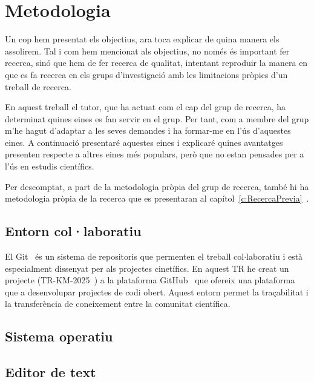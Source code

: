 \chapter{Metodologia}


Un cop hem presentat els objectius, ara toca explicar de quina manera els assolirem. Tal i com hem mencionat als objectius, no només és important fer recerca, sinó que hem de fer recerca de qualitat, intentant reproduir la manera en que es fa recerca en els grups d'investigació amb les limitacions pròpies d'un treball de recerca.

En aquest treball el tutor, que ha actuat com el cap del grup de recerca, ha determinat quines eines es fan servir en el grup. Per tant, com a membre del grup m'he hagut d'adaptar a les seves demandes i ha formar-me en l'ús d'aquestes eines. A continuació presentaré aquestes eines i explicaré quines avantatges presenten respecte a altres eines més populars, però que no estan pensades per a l'ús en estudis científics.

Per descomptat, a part de la metodologia pròpia del grup de recerca, també hi ha metodologia pròpia de la recerca que es presentaran al capítol~\ref{c:RecercaPrevia}~.



\section{Entorn col·laboratiu}

El Git~\cite{git} és un sistema de repositoris que permenten el treball col$\cdot$laboratiu i està especialment dissenyat per als projectes cinetífics. En aquest TR he creat un projecte (TR-KM-2025~\cite{TR-KM-2025}) a
la plataforma GitHub~\cite{GitHub} que ofereix una plataforma que a desenvolupar projectes de codi obert. Aquest entorn permet la traçabilitat i la transferència de coneixement entre la comunitat científica.


\section{Sistema operatiu}

\section{Editor de text} \label{sec:kile}

